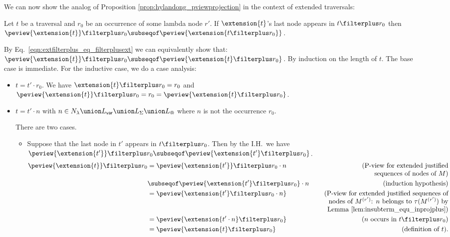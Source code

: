 We can now show the analog of Proposition \ref{prop:hylandong_pviewprojection} in the context of extended traversals:
\begin{proposition}
\label{prop:analog_pviewprojection} Let $t$ be a traversal and $r_0$
be an occurrence of some lambda node $r'$.
If $\extension{t}$'s last node appears in $t\filterplus r_0$ then
 $\peview{ \extension{t}}  \filterplus r_0 \subseqof \peview{ \extension{t\filterplus
 r_0}}$.
\end{proposition}
\proof
By Eq.\ \ref{eqn:extfilterplus_eq_filterplusext} we can equivalently show that:
$\peview{ \extension{t}}  \filterplus r_0 \subseqof \peview{ \extension{t}\filterplus
 r_0}$. By induction on the length of $t$. The base case is immediate. For the inductive case,
we do a case analysis:
    \begin{itemize}
    \item $t =  t' \cdot r_0$. We have $\extension{t} \filterplus r_0 = r_0$ and
     $\peview{\extension{t}} \filterplus r_0 = r_0 = \peview{\extension{t} \filterplus r_0}$.

    \item $t = t' \cdot n$ with $n \in N_\lambda \union L_{\sf var} \union
    L_\Sigma \union L_@$ where $n$ is not the occurrence $r_0$.

    There are two cases.
    \begin{itemize}
        \item Suppose that the last node in $t'$ appears in $t\filterplus r_0$. Then
        by the I.H.\ we have $\peview{\extension{t'}} \filterplus  r_0 \subseqof \peview{\extension{t'} \filterplus  r_0}$.
            \begin{align*}
            \peview{\extension{t}} \filterplus r_0
                &=  \peview{\extension{t'}} \filterplus r_0 \cdot n  & \parbox[t]{7cm}{(\raggedleft P-view for extended justified\\sequences of nodes of $M$)} \\
                &\subseqof  \peview{\extension{t'} \filterplus  r_0} \cdot n            & (\mbox{induction hypothesis}) \\
                &=  \peview{\extension{t'} \filterplus  r_0 \cdot n} & \parbox[t]{7cm}{\raggedleft (P-view for extended justified sequences of nodes of $M^{(r')}$: $n$ belongs to $\tau(M^{(r')})$
                by Lemma \ref{lem:insubterm_equ_inprojplus})} \\
                &=  \peview{\extension{t' \cdot n} \filterplus  r_0  }   & (\mbox{$n$ occurs in $t\filterplus r_0$}) \\
                &= \peview{\extension{t} \filterplus  r_0  }     & (\mbox{definition of } t).
            \end{align*}


\end{itemize}
\end{itemize}
